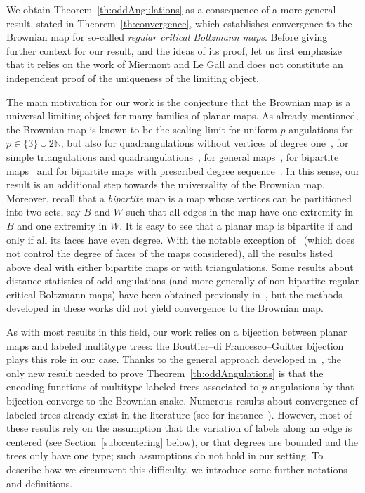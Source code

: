 \documentclass[10pt]{amsart}
\theoremstyle{definition}\newtheorem{defi}[theo]{Definition}\newtheorem{rema}[theo]{Remark}\newtheorem{exam}[theo]{Example}\newtheorem{exem}[theo]{Example}\newtheorem{nota}[theo]{Notation}
\providecommand{\N}{}
\renewcommand{\N}{\mathbb{N}}
\begin{document}
We obtain Theorem~\ref{th:oddAngulations} as a consequence of a more general result, stated in Theorem~\ref{th:convergence}, which establishes convergence to the Brownian map for so-called \emph{regular critical Boltzmann maps}. Before giving further context for our result, and the ideas of its proof, let us first emphasize that it relies on the work of Miermont and Le Gall and does not constitute an independent proof of the uniqueness of the limiting object.


The main motivation for our work is the conjecture that the Brownian map is a universal limiting object for many families of planar maps. As already mentioned, the Brownian map is known to be the scaling limit for uniform $p$-angulations for $p\in \{3\}\cup 2\N$, but also for quadrangulations without vertices of degree one~\cite{beltran13quad}, for simple triangulations and quadrangulations~\cite{AddarioAlbenqueSimple}, for general maps~\cite{BettinelliJacobMiermont}, for bipartite maps~\cite{AbrahamBipartite} and for bipartite maps with prescribed degree sequence~\cite{MarzoukPrescribed}. In this sense, our result is an additional step towards the universality of the Brownian map. Moreover, recall that a \emph{bipartite} map is a map whose vertices can be partitioned into two sets, say $B$ and $W$ such that all edges in the map have one extremity in $B$ and one extremity in $W$. It is easy to see that a planar map is bipartite if and only if all its faces have even degree. With the notable exception of~\cite{BettinelliJacobMiermont} (which does not control the degree of faces of the maps considered), all the results listed above deal with either bipartite maps or with triangulations. Some results about distance statistics of odd-angulations (and more generally of non-bipartite regular critical Boltzmann maps) have been obtained previously in~\cite{MiermontInvariance,MiermontWeill}, but the methods developed in these works did not yield convergence to the Brownian map.

As with most results in this field, our work relies on a bijection between planar maps and labeled multitype trees: the Bouttier--di Francesco--Guitter bijection~\cite{BDG2004} plays this role in our case. Thanks to the general approach developed in~\cite{LeGallUniqueness}, the only new result needed to prove Theorem~\ref{th:oddAngulations} is that the encoding functions of multitype labeled trees associated to $p$-angulations by that bijection converge to the Brownian snake. Numerous results about convergence of labeled trees already exist in the literature (see for instance~\cite{MarckertLineage,MiermontInvarianceTrees}). However, most of these results rely on the assumption that the variation of labels along an edge is centered (see Section~\ref{sub:centering} below), or that degrees are bounded and the trees only have one type; such assumptions do not hold in our setting. To describe how we circumvent this difficulty, we introduce some further notations and definitions.
\end{document}
